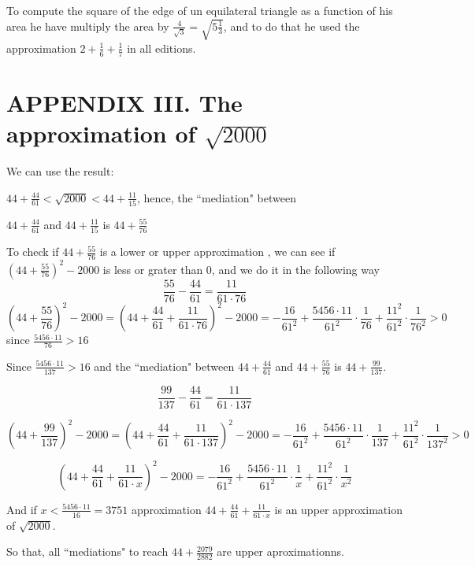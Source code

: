 \documentclass{amsart}
\begin{document}
To compute the square of the edge of un equilateral triangle as a function of his area he have multiply the area by $\frac{4}{\sqrt{3}}=\sqrt{5\frac {1}{3}}$, and to do that he used the approximation $2+\frac{1}{6}+\frac{1}{7}$ in all editions.

\section{APPENDIX III. The approximation of $\sqrt{2000}$}

We can use the result:

$44+\frac{44}{61}<\sqrt{2000}<44+\frac{11}{15}$,
hence, the ``mediation" between

 $44+\frac{44}{61}$ and $44+\frac{11}{15}$ is $44+\frac{55}{76}$

To check if $44+\frac{55}{76}$ is a lower or upper approximation , we can see if  $(44+\frac{55}{76})^2-2000$ is less or grater than 0, and we do it in the following way
$$\frac{55}{76}-\frac{44}{61}=\frac{11}{61\cdot 76}$$
$$(44+\frac{55}{76})^2-2000=(44+\frac{44}{61}+\frac{11}{61\cdot 76})^2-2000=-\frac{16}{61^2}+\frac{5456\cdot 11}{61^2}\cdot \frac{1}{76}+\frac{11^2}{61^2}\cdot \frac{1}{76^2}>0$$
since $\frac{5456\cdot 11}{76}>16$

Since $\frac{5456\cdot 11}{137}>16$ and the ``mediation" between  $44+\frac{44}{61}$ and
$44+\frac{55}{76}$ is $44+\frac{99}{137}$.

$$ \frac{99}{137}-\frac{44}{61}=\frac{11}{61\cdot 137}$$

$$(44+\frac{99}{137})^2-2000=(44+\frac{44}{61}+\frac{11}{61\cdot 137})^2-2000=-\frac{16}{61^2}+\frac{5456\cdot 11}{61^2}\cdot \frac{1}{137}+\frac{11^2}{61^2}\cdot \frac{1}{137^2}>0$$

$$(44+\frac{44}{61}+\frac{11}{61\cdot x})^2-2000=-\frac{16}{61^2}+\frac{5456\cdot 11}{61^2}\cdot \frac{1}{x}+\frac{11^2}{61^2}\cdot \frac{1}{x^2}$$

And if $x<\frac{5456\cdot 11}{16}= 3751$ approximation $44+\frac{44}{61}+\frac{11}{61\cdot x}$ is an upper approximation of $\sqrt{2000}$.

So that, all ``mediations" to reach
$44+\frac{2079}{2882}$ are upper aproximationns.
\end{document}
